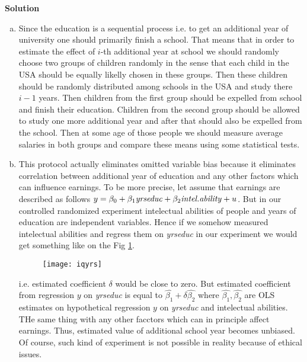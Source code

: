 \documentclass[a4paper]{article}
\begin{document}
\textbf{Solution}
\begin{enumerate}[(a)]
	\item Since the education is a sequential process i.e. to get an additional year of university one should primarily finish a school. That means that in order to estimate the effect of $i$-th additional year at school we should randomly choose two groups of children randomly in the sense that each child in the USA should be equally likelly chosen in these groups. Then these children should be randomly distributed among schools in the USA and study there $i-1$ years. Then children from the first group should be expelled from school and finish their education. Children from the second group should be allowed to study one more additional year and after that should also be expelled from the school. Then at some age of those people we should measure average salaries in both groups and compare these means using some statistical tests. 
	\item This protocol actually eliminates omitted variable bias because it eliminates correlation between additional year of education and any other factors which can influence earnings. To be more precise, let assume that earnings are described as follows $y = \beta_0 + \beta_1 \text{\textit{yrseduc}} + \beta_2 \text{\textit{intel.ability}} + u$. But in our controlled randomized experiment intelectual abilities of people and years of education are independent variables. Hence if we somehow measured intelectual abilities and regress them on \textit{yrseduc} in our experiment we would get something like on the Fig \ref{fig2}. 
		\begin{figure}[h]
		\centering
		\texttt{[image: iqyrs]}
		\caption{}\label{fig2}
	\end{figure}
i.e. estimated coefficient $\delta$ would be close to zero. But estimated coefficient from regression $y$ on \textit{yrseduc} is equal to $\hat{\beta_1} + \delta \hat{\beta_2}$ where $\hat{\beta_1}, \hat{\beta_2}$ are OLS estimates on hypothetical regression $y$ on \textit{yrseduc} and intelectual abilities. THe same thing with any other facctors which can in principle affect earnings. Thus, estimated value of additional school year becomes unbiased. Of course, such kind of experiment is not possible in reality because of ethical issues.
\end{enumerate}
\end{document}
